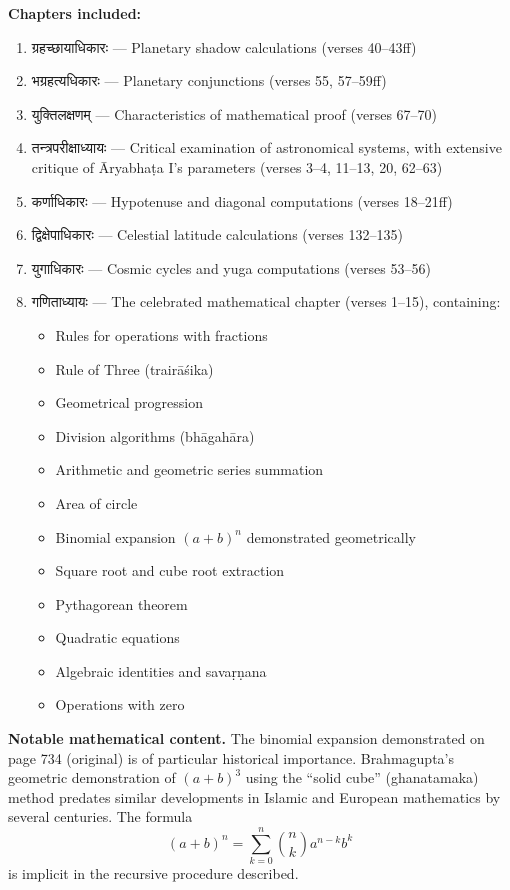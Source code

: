 \documentclass[11pt,a4paper]{article}
\newcommand{\dev}[1]{{\devanagarifont #1}}
\begin{document}
\textbf{Chapters included:}
\begin{enumerate}[leftmargin=2em]
  \item \dev{ग्रहच्छायाधिकारः} — Planetary shadow calculations (verses 40--43ff)
  \item \dev{भग्रहत्यधिकारः} — Planetary conjunctions (verses 55, 57--59ff)
  \item \dev{युक्तिलक्षणम्} — Characteristics of mathematical proof (verses 67--70)
  \item \dev{तन्त्रपरीक्षाध्यायः} — Critical examination of astronomical systems, with extensive critique of Āryabhaṭa I's parameters (verses 3--4, 11--13, 20, 62--63)
  \item \dev{कर्णाधिकारः} — Hypotenuse and diagonal computations (verses 18--21ff)
  \item \dev{द्विक्षेपाधिकारः} — Celestial latitude calculations (verses 132--135)
  \item \dev{युगाधिकारः} — Cosmic cycles and yuga computations (verses 53--56)
  \item \dev{गणिताध्यायः} — The celebrated mathematical chapter (verses 1--15), containing:
  \begin{itemize}
    \item Rules for operations with fractions
    \item Rule of Three (trairāśika)
    \item Geometrical progression
    \item Division algorithms (bhāgahāra)
    \item Arithmetic and geometric series summation
    \item Area of circle
    \item Binomial expansion $(a+b)^n$ demonstrated geometrically
    \item Square root and cube root extraction
    \item Pythagorean theorem
    \item Quadratic equations
    \item Algebraic identities and savaṛṇana
    \item Operations with zero
  \end{itemize}
\end{enumerate}

\textbf{Notable mathematical content.} The binomial expansion demonstrated on page 734 (original) is of particular historical importance. Brahmagupta's geometric demonstration of $(a+b)^3$ using the ``solid cube'' (ghanatamaka) method predates similar developments in Islamic and European mathematics by several centuries. The formula
\[
(a+b)^n = \sum_{k=0}^{n} \binom{n}{k} a^{n-k} b^k
\]
is implicit in the recursive procedure described.
\end{document}

